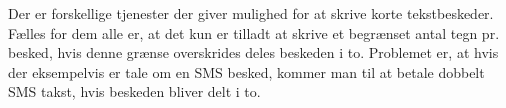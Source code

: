 Der er forskellige tjenester der giver mulighed for at skrive korte tekstbeskeder. Fælles for dem alle er, at det kun er tilladt at skrive et begrænset antal tegn pr. besked, hvis denne grænse overskrides deles beskeden i to. Problemet er, at hvis der eksempelvis er tale om en SMS besked, kommer man til at betale dobbelt SMS takst, hvis beskeden bliver delt i to.
